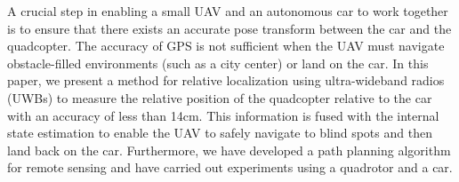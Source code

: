 A crucial step in enabling a small UAV and an autonomous car to work
together is to ensure that there exists an accurate pose transform between the car
and the quadcopter. The accuracy of GPS is not sufficient when the UAV must navigate
obstacle-filled environments (such as a city center) or land on the car. In
this paper, we present a method for relative localization using ultra-wideband
radios (UWBs) to measure the relative position of the quadcopter relative to the car
with an accuracy of less than 14cm. This information is fused with the internal
state estimation to enable the UAV to safely navigate to blind spots and then
land back on the car. Furthermore, we have developed a path planning algorithm
for remote sensing and have carried out experiments using a quadrotor and a
car.


